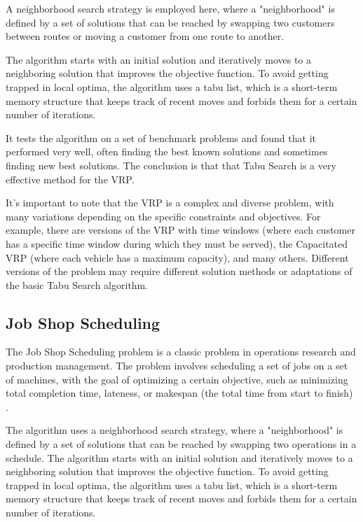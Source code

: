 \documentclass[conference]{IEEEtran}
\begin{document}
A neighborhood search strategy is employed here, where a "neighborhood" is defined by a set of solutions that can be reached by swapping two customers between routes or moving a customer from one route to another.

The algorithm starts with an initial solution and iteratively moves to a neighboring solution that improves the objective function. To avoid getting trapped in local optima, the algorithm uses a tabu list, which is a short-term memory structure that keeps track of recent moves and forbids them for a certain number of iterations.

It tests the algorithm on a set of benchmark problems and found that it performed very well, often finding the best known solutions and sometimes finding new best solutions. The conclusion is that that Tabu Search is a very effective method for the VRP.

It's important to note that the VRP is a complex and diverse problem, with many variations depending on the specific constraints and objectives. For example, there are versions of the VRP with time windows (where each customer has a specific time window during which they must be served), the Capacitated VRP (where each vehicle has a maximum capacity), and many others. Different versions of the problem may require different solution methods or adaptations of the basic Tabu Search algorithm.

\subsection{Job Shop Scheduling}

The Job Shop Scheduling problem is a classic problem in operations research and production management. The problem involves scheduling a set of jobs on a set of machines, with the goal of optimizing a certain objective, such as minimizing total completion time, lateness, or makespan (the total time from start to finish) \cite{nowicki1996fast}.

The algorithm uses a neighborhood search strategy, where a "neighborhood" is defined by a set of solutions that can be reached by swapping two operations in a schedule. The algorithm starts with an initial solution and iteratively moves to a neighboring solution that improves the objective function. To avoid getting trapped in local optima, the algorithm uses a tabu list, which is a short-term memory structure that keeps track of recent moves and forbids them for a certain number of iterations.
\end{document}

